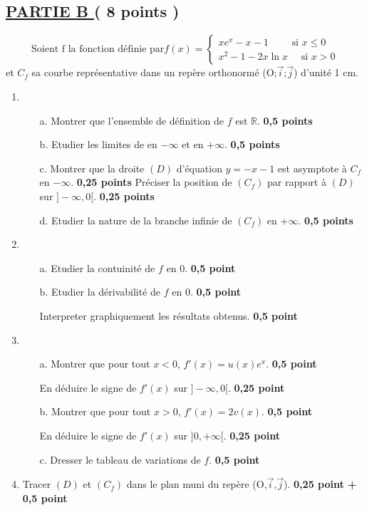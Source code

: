 \documentclass[12pt]{article}
\begin{document}
\subsection*{ \underline{PARTIE B } ( 8 points ) }
\[
\text{Soient f la fonction définie par} 
f(x)=
\begin{cases}
xe^{x}-x-1 \quad\quad  \text{ si }  x \leq 0\\
x^{2}-1-2x\ln x \quad \text{ si } x > 0 
\end{cases}
\]
et $C_{f}$ sa courbe représentative dans un repère orthonormé (O;$\vec{i}$;$\vec{j}$) d'unité 1 cm.
\begin{enumerate}
\item
\begin{enumerate}
\item[a.] Montrer que l'ensemble de définition de $f$ est $\mathbb{R}$.\textbf{ 0,5 points}
\item[b.] Etudier les limites de en $-\infty$ et en $+\infty$.\textbf{ 0,5 points}
\item[c.]Montrer que la droite $(D)$ d'équation $y=-x-1$ est asymptote à $C_{f}$ en $-\infty$. \textbf{ 0,25 points}
Préciser la position de $(C_{f})$ par rapport à $(D)$ sur $]-\infty, 0[.$ \textbf{ 0,25 points}
\item[d.]Etudier la nature de la branche infinie de $(C_{f})$ en $+\infty$.\textbf{ 0,5 points}
\end{enumerate}
\item
\begin{enumerate}
\item[a.]Etudier la contuinité de $f$ en  $0$. \textbf{ 0,5 point}
\item[b.]Etudier la dérivabilité de $f$ en $0$. \textbf{ 0,5 point}

	Interpreter  graphiquement les résultats obtenus. \textbf{ 0,5 point}

\end{enumerate}
\item
\begin{enumerate}
\item[a.] Montrer que pour tout $x < 0 $, $f'(x)=u(x)e^{x}$. \textbf{ 0,5 point}

	En déduire le signe de $f'(x)$ sur $]-\infty, 0[.$ \textbf{ 0,25 point}
\item[b.] Montrer que pour tout $ x > 0$, $f'(x)=2v(x).$ \textbf{ 0,5 point}

	En déduire le signe de $f'(x)$ sur $]0, +\infty[.$ \textbf{ 0,25 point}
\item[c.] Dresser le tableau de variations de $f$. \textbf{ 0,5 point}
\end{enumerate}
\item Tracer $(D)$ et $(C_{f})$ dans le plan muni du repère (O,$\vec{i}$,$\vec{j}$). \textbf{ 0,25 point + 0,5 point}


\end{enumerate}
\end{document}
